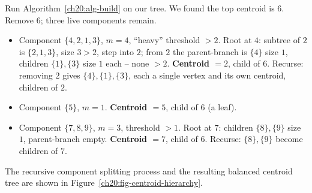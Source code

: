 \begin{labbox}
Run Algorithm~\ref{ch20:alg-build} on our tree. We found the top centroid is $6$.
Remove $6$; three live components remain.
\begin{itemize}
  \item Component $\{4,2,1,3\}$, $m=4$, ``heavy'' threshold $>2$. Root at $4$:
        subtree of $2$ is $\{2,1,3\}$, size $3>2$, step into $2$; from $2$ the
        parent-branch is $\{4\}$ size $1$, children $\{1\},\{3\}$ size $1$ each --
        none $>2$. \textbf{Centroid $=2$}, child of $6$. Recurse: removing $2$
        gives $\{4\},\{1\},\{3\}$, each a single vertex and its own centroid,
        children of $2$.
  \item Component $\{5\}$, $m=1$. \textbf{Centroid $=5$}, child of $6$ (a leaf).
  \item Component $\{7,8,9\}$, $m=3$, threshold $>1$. Root at $7$: children
        $\{8\},\{9\}$ size $1$, parent-branch empty. \textbf{Centroid $=7$}, child
        of $6$. Recurse: $\{8\},\{9\}$ become children of $7$.
\end{itemize}
\end{labbox}

The recursive component splitting process and the resulting balanced centroid tree are shown in Figure~\ref{ch20:fig-centroid-hierarchy}.


